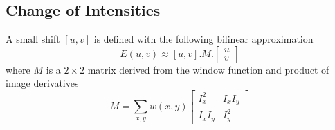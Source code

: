 \documentclass{report}
\begin{document}
\subsection{Change of Intensities}

A small shift $[u,v]$ is defined with the following bilinear approximation 
$$
    E(u,v) \approx [u,v] . M . \begin{bmatrix}
        u \\
        v
    \end{bmatrix}
$$
where $M$ is a $2 \times 2$ matrix derived from the window function and product
of image derivatives 
$$
    M = \sum_{x,y} w(x,y) \begin{bmatrix}
        I_x^2 & I_x I_y \\ 
        I_x I_y & I_y^2
    \end{bmatrix}
$$
\end{document}
